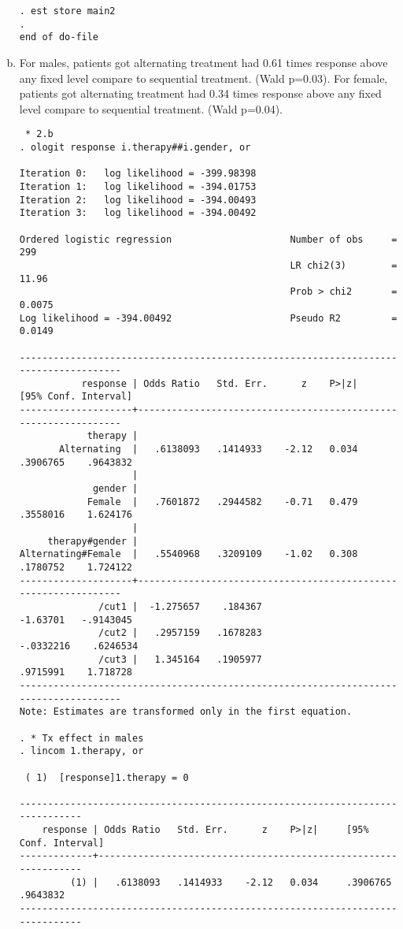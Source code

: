 \documentclass{article}
\begin{document}
\begin{enumerate}[a.]
\begin{verbatim}
. est store main2
. 
end of do-file
\end{verbatim}

\item For males, patients got alternating treatment had 0.61 times response above any fixed level compare to sequential treatment. (Wald p=0.03).
For female, patients got alternating treatment had 0.34 times response above any fixed level compare to sequential treatment. (Wald p=0.04).

\begin{verbatim}
 * 2.b
. ologit response i.therapy##i.gender, or

Iteration 0:   log likelihood = -399.98398  
Iteration 1:   log likelihood = -394.01753  
Iteration 2:   log likelihood = -394.00493  
Iteration 3:   log likelihood = -394.00492  

Ordered logistic regression                     Number of obs     =        299
                                                LR chi2(3)        =      11.96
                                                Prob > chi2       =     0.0075
Log likelihood = -394.00492                     Pseudo R2         =     0.0149

-------------------------------------------------------------------------------------
           response | Odds Ratio   Std. Err.      z    P>|z|     [95% Conf. Interval]
--------------------+----------------------------------------------------------------
            therapy |
       Alternating  |   .6138093   .1414933    -2.12   0.034     .3906765    .9643832
                    |
             gender |
            Female  |   .7601872   .2944582    -0.71   0.479     .3558016    1.624176
                    |
     therapy#gender |
Alternating#Female  |   .5540968   .3209109    -1.02   0.308     .1780752    1.724122
--------------------+----------------------------------------------------------------
              /cut1 |  -1.275657    .184367                      -1.63701   -.9143045
              /cut2 |   .2957159   .1678283                     -.0332216    .6246534
              /cut3 |   1.345164   .1905977                      .9715991    1.718728
-------------------------------------------------------------------------------------
Note: Estimates are transformed only in the first equation.

. * Tx effect in males
. lincom 1.therapy, or

 ( 1)  [response]1.therapy = 0

------------------------------------------------------------------------------
    response | Odds Ratio   Std. Err.      z    P>|z|     [95% Conf. Interval]
-------------+----------------------------------------------------------------
         (1) |   .6138093   .1414933    -2.12   0.034     .3906765    .9643832
------------------------------------------------------------------------------


\end{verbatim}
\end{enumerate}
\end{document}
